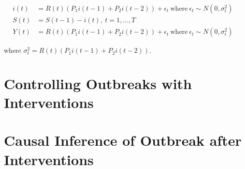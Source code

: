 \documentclass[11pt,a4paper,titlepage]{article}
\theoremstyle{definition}
\begin{document}
\begin{align}
    i(t) & = R(t) \left(P_{1} i(t-1)+P_{2} i(t-2) \right)+\epsilon_{t} ~ \text{where} ~ \epsilon_t \sim N(0, \sigma_t^2) & \\
    S(t) & = S(t - 1) - i(t), ~t=1,\ldots,T & \nonumber \\
    Y(t) & = R(t) \left(P_{1} i(t-1)+P_{2} i(t-2) \right)+\epsilon_{t} ~ \text{where} ~ \epsilon_t \sim N(0, \sigma_t^2)  \label{eq:Y-relax-assm-1} &
\end{align}

where $\sigma_t^2 = R(t) \left(P_{1} i(t-1)+P_{2} i(t-2) \right)$.



\section{Controlling Outbreaks with Interventions}
\label{sec:control}

\section{Causal Inference of Outbreak after Interventions}
\label{sec:causal}




\printbibliography
\label{sec:bibliography}
\end{document}

